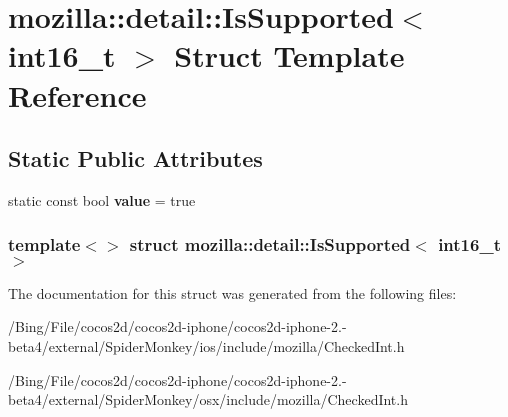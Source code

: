 \hypertarget{structmozilla_1_1detail_1_1_is_supported_3_01int16__t_01_4}{\section{mozilla\-:\-:detail\-:\-:Is\-Supported$<$ int16\-\_\-t $>$ Struct Template Reference}
\label{structmozilla_1_1detail_1_1_is_supported_3_01int16__t_01_4}
}
\subsection*{Static Public Attributes}
\begin{DoxyCompactItemize}
\item 
\hypertarget{structmozilla_1_1detail_1_1_is_supported_3_01int16__t_01_4_a1c40ac9c1f189aa71271e44106385586}{static const bool {\bfseries value} = true}\label{structmozilla_1_1detail_1_1_is_supported_3_01int16__t_01_4_a1c40ac9c1f189aa71271e44106385586}

\end{DoxyCompactItemize}
\subsubsection*{template$<$$>$ struct mozilla\-::detail\-::\-Is\-Supported$<$ int16\-\_\-t $>$}



The documentation for this struct was generated from the following files\-:\begin{DoxyCompactItemize}
\item 
/\-Bing/\-File/cocos2d/cocos2d-\/iphone/cocos2d-\/iphone-\/2.-\/beta4/external/\-Spider\-Monkey/ios/include/mozilla/Checked\-Int.\-h\item 
/\-Bing/\-File/cocos2d/cocos2d-\/iphone/cocos2d-\/iphone-\/2.-\/beta4/external/\-Spider\-Monkey/osx/include/mozilla/Checked\-Int.\-h\end{DoxyCompactItemize}
